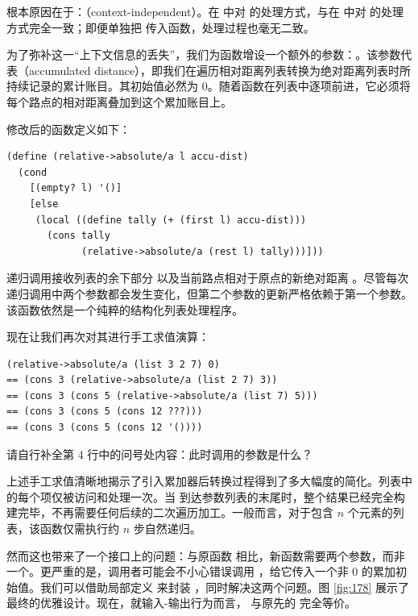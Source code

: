 根本原因在于：（context-independent）。在  中对  的处理方式，与在  中对  的处理方式完全一致；即便单独把  传入函数，处理过程也毫无二致。

为了弥补这一“上下文信息的丢失”，我们为函数增设一个额外的参数：。该参数代表（accumulated distance），即我们在遍历相对距离列表转换为绝对距离列表时所持续记录的累计账目。其初始值必然为 0。随着函数在列表中逐项前进，它必须将每个路点的相对距离叠加到这个累加账目上。

修改后的函数定义如下：

\begin{lstlisting}[language=BSL]
(define (relative->absolute/a l accu-dist)
  (cond
    [(empty? l) '()]
    [else
     (local ((define tally (+ (first l) accu-dist)))
       (cons tally
             (relative->absolute/a (rest l) tally)))]))
\end{lstlisting}

递归调用接收列表的余下部分  以及当前路点相对于原点的新绝对距离 。尽管每次递归调用中两个参数都会发生变化，但第二个参数的更新严格依赖于第一个参数。该函数依然是一个纯粹的结构化列表处理程序。

现在让我们再次对其进行手工求值演算：

\begin{lstlisting}[language=BSL]
   (relative->absolute/a (list 3 2 7) 0)
== (cons 3 (relative->absolute/a (list 2 7) 3))
== (cons 3 (cons 5 (relative->absolute/a (list 7) 5)))
== (cons 3 (cons 5 (cons 12 ???)))
== (cons 3 (cons 5 (cons 12 '())))
\end{lstlisting}

\begin{notebox}[请停下来思考！]
请自行补全第 4 行中的问号处内容：此时调用的参数是什么？
\end{notebox}

上述手工求值清晰地揭示了引入累加器后转换过程得到了多大幅度的简化。列表中的每个项仅被访问和处理一次。当  到达参数列表的末尾时，整个结果已经完全构建完毕，不再需要任何后续的二次遍历加工。一般而言，对于包含 $n$ 个元素的列表，该函数仅需执行约 $n$ 步自然递归。

然而这也带来了一个接口上的问题：与原函数  相比，新函数需要两个参数，而非一个。更严重的是，调用者可能会不小心错误调用 ，给它传入一个非 0 的累加初始值。我们可以借助局部定义  来封装 ，同时解决这两个问题。图 \ref{fig:178} 展示了最终的优雅设计。现在，就输入-输出行为而言， 与原先的  完全等价。

